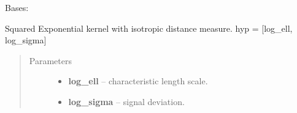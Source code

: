 \documentclass[letterpaper,10pt,english]{sphinxmanual}
\begin{document}
\begin{fulllineitems}
\label{pyGPs.Core:pyGPs.Core.cov.RBF}
Bases: {\hyperref[pyGPs.Core:pyGPs.Core.cov.Kernel]{}}

Squared Exponential kernel with isotropic distance measure. hyp = {[}log\_ell, log\_sigma{]}
\begin{quote}\begin{description}
\item[{Parameters}] \leavevmode\begin{itemize}
\item {} 
\textbf{log\_ell} -- characteristic length scale.

\item {} 
\textbf{log\_sigma} -- signal deviation.

\end{itemize}

\end{description}\end{quote}

\begin{fulllineitems}
\label{pyGPs.Core:pyGPs.Core.cov.RBF.getCovMatrix}
\end{fulllineitems}


\begin{fulllineitems}
\label{pyGPs.Core:pyGPs.Core.cov.RBF.getDerMatrix}
\end{fulllineitems}


\end{fulllineitems}

\end{document}
